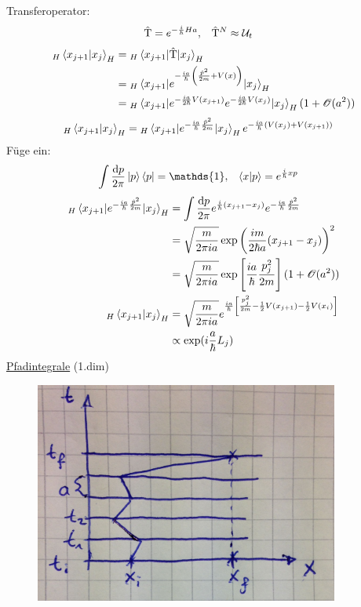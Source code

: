 Transferoperator:
	\begin{align*}
		\hat{\mathrm{T}} &= e^{-\frac{i}{\hbar} H a} ,&
		\hat{\mathrm{T}}^N &\approx \mathcal{U}_t
	\end{align*}
	\begin{align*}
		_H\braket{x_{j+1} | x_j}_H &= {}_H\braket{x_{j+1}| \hat{\mathrm{T}} | x_j}_H \\
		&= {}_H \braket{x_{j+1} | e^{-\frac{ia}{\hbar} \left(\frac{\hat{p}^2}{2m} + V(x)\right)} | x_j}_H \\
		&= {}_H \braket{x_{j+1} | e^{-\frac{ia}{2\hbar} V(x_{j+1})} e^{-\frac{ia}{2\hbar}V(x_j)} | x_j}_H (1 + \mathscr{O}(a^2))
	\end{align*}
	\begin{align*}
		_H\braket{x_{j+1} | x_j}_H &=
		{}_H\braket{x_{j+1} | e^{-\frac{ia}{\hbar} \frac{\hat{p}^2}{2m}} | x_j}_H
		e^{-\frac{ia}{\hbar} \left(V(x_j) + V(x_{j + 1})\right)}
	\end{align*}
Füge ein:
	\begin{align*}
		\int \frac{\diff p}{2 \pi} \ket{p} \bra{p} &= \mathds{1} ,& 
		\braket{x | p} &= e^{\frac{i}{\hbar} xp}
	\end{align*}
	\begin{align*}
		_H\braket{x_{j+1} | e^{-\frac{ia}{\hbar} \frac{\hat{p}^2}{2m}}| x_j}_H
		&= \int \frac{\mathrm{d} p}{2 \pi} e^{\frac{i}{\hbar} (x_{j+1} - x_j)}  e^{-\frac{ia}{\hbar} \frac{\hat{p}^2}{2m}} \\
		&= \sqrt{\frac{m}{2 \pi i a}} \exp\left(\frac{im}{2 \hbar a} (x_{j+1} - x_j)\right)^2 \\
		&= \sqrt{\frac{m}{2 \pi i a}} \exp\left[\frac{ia}{\hbar} \frac{p_j^2}{2m}\right]
		(1 + \mathscr{O}(a^2)) \\
		_H\braket{x_{j+1} | x_j}_H &=
		\sqrt{\frac{m}{2 \pi i a}} e^{\frac{ia}{\hbar} \left[\frac{p_j^2}{2m} - \frac{1}{2} V(x_{j+1}) - \frac{1}{2} V(x_i)\right]} \\
		&\propto \exp (i \frac{a}{\hbar} L_j)
	\end{align*}
\underline{Pfadintegrale} (1.dim) 
	\begin{figure} [h]
		\begin{center}
			\includegraphics[width=10cm]{Uebergangsamplituden2}
		\end{center}
	\end{figure}
	

